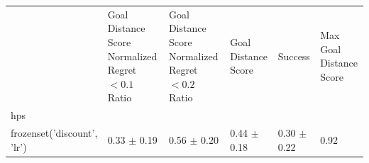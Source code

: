 \begin{tabular}{llllll}
\toprule
 & Goal Distance Score Normalized Regret $< 0.1$ Ratio & Goal Distance Score Normalized Regret $< 0.2$ Ratio & Goal Distance Score & Success & Max Goal Distance Score \\
hps &  &  &  &  &  \\
\midrule
frozenset({'discount', 'lr'}) & 0.33 $\pm$ 0.19 & 0.56 $\pm$ 0.20 & 0.44 $\pm$ 0.18 & 0.30 $\pm$ 0.22 & 0.92 \\
\bottomrule
\end{tabular}

